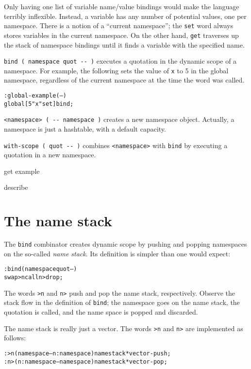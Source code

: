 \documentclass[english]{book}
\begin{document}
Only having one list of variable name/value bindings would make the language terribly inflexible. Instead, a variable has any number of potential values, one per namespace. There is a notion of a ``current namespace''; the \texttt{set} word always stores variables in the current namespace. On the other hand, \texttt{get} traverses up the stack of namespace bindings until it finds a variable with the specified name.

\texttt{bind ( namespace quot -{}- )} executes a quotation in the dynamic scope of a namespace. For example, the following sets the value of \texttt{x} to 5 in the global namespace, regardless of the current namespace at the time the word was called.

\begin{alltt}
: global-example ( -- )
    global {[} 5 "x" set {]} bind ;
\end{alltt}

\texttt{<namespace> ( -{}- namespace )} creates a new namespace object. Actually, a namespace is just a hashtable, with a default capacity.

\texttt{with-scope ( quot -{}- )} combines \texttt{<namespace>} with \texttt{bind} by executing a quotation in a new namespace.

get example

describe

\section{The name stack}

The \texttt{bind} combinator creates dynamic scope by pushing and popping namespaces on the so-called \emph{name stack}. Its definition is simpler than one would expect:

\begin{alltt}
: bind ( namespace quot -- )
    swap >n call n> drop ;
\end{alltt}

The words \texttt{>n} and \texttt{n>} push and pop the name stack, respectively. Observe the stack flow in the definition of \texttt{bind}; the namespace goes on the name stack, the quotation is called, and the name space is popped and discarded.

The name stack is really just a vector. The words \texttt{>n} and \texttt{n>} are implemented as follows:

\begin{alltt}
: >n ( namespace -- n:namespace ) namestack* vector-push ;
: n> ( n:namespace -- namespace ) namestack* vector-pop ;
\end{alltt}
\end{document}
